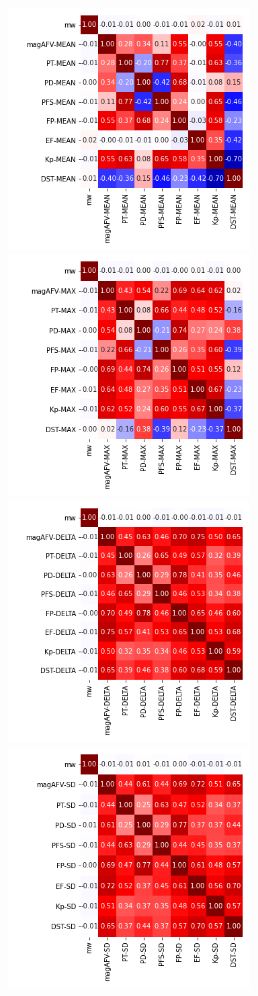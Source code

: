 \documentclass[12pt]{article}
\begin{document}
\newpage

\begin{figure}
   \includegraphics[width=0.57\textwidth]{five-six_mean_1.png}
   \includegraphics[width=0.57\textwidth]{five-six_max_1.png}
   \includegraphics[width=0.57\textwidth]{five-six_delta_1.png}
   \includegraphics[width=0.57\textwidth]{five-six_sd_1.png}
\end{figure}
\end{document}
